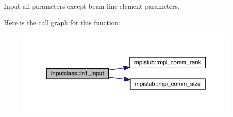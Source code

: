 Input all parameters except beam line element parameters. 

Here is the call graph for this function\+:\nopagebreak
\begin{figure}[H]
\begin{center}
\leavevmode
\includegraphics[width=350pt]{namespaceinputclass_a907319f6e5d34930fbc63f5af426e9bd_cgraph}
\end{center}
\end{figure}
\mbox{\label{namespaceinputclass_a943f99f8cd6dc0476378072a9d4d27cd}} 
